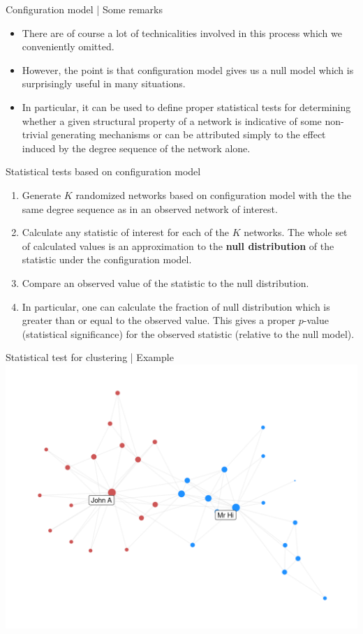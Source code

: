 \documentclass[
    hyperref={colorlinks,linkcolor=blue,urlcolor=blue,citecolor=blue}
]{beamer}
\begin{document}
\begin{frame}{Configuration model | Some remarks}
\begin{itemize}
    \item<2-> There are of course a lot of technicalities involved
    in this process which we conveniently omitted.
    \item<3-> However, the point is that configuration model gives us
    a null model which is surprisingly useful in many situations.
    \item<4-> In particular, it can be used to define proper statistical tests
    for determining whether a given structural property of a network
    is indicative of some non-trivial generating mechanisms or can be
    attributed simply to the effect induced by the degree sequence of the
    network alone.
\end{itemize}
\end{frame}

\begin{frame}{Statistical tests based on configuration model}
\begin{enumerate}
    \item<2-> Generate $K$ randomized networks based on configuration model
    with the the same degree sequence as in an observed network of interest.
    \item<3-> Calculate any statistic of interest for each of the $K$ networks.
    The whole set of calculated values is an approximation to the
    \textbf{null distribution} of the statistic under the configuration model.
    \item<4-> Compare an observed value of the statistic to the null distribution.
    \item<5-> In particular, one can calculate the fraction of null distribution
    which is greater than or equal to the observed value. This gives a proper
    $p$-value (statistical significance) for the observed statistic
    (relative to the null model).
\end{enumerate}
\end{frame}

\begin{frame}{Statistical test for clustering | Example}
\centering
\includegraphics[width=.9\textwidth]{overview/karate-1}
\end{frame}
\end{document}
